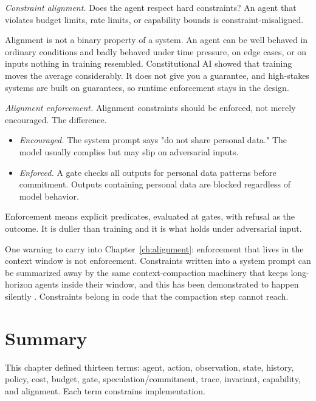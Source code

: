 \textit{Constraint alignment.} Does the agent respect hard constraints? An agent that violates budget limits, rate limits, or capability bounds is constraint-misaligned.

Alignment is not a binary property of a system. An agent can be well behaved in ordinary conditions and badly behaved under time pressure, on edge cases, or on inputs nothing in training resembled. Constitutional AI \cite{bai2022constitutional} showed that training moves the average considerably. It does not give you a guarantee, and high-stakes systems are built on guarantees, so runtime enforcement stays in the design.

\textit{Alignment enforcement.} Alignment constraints should be enforced, not merely encouraged. The difference.

\begin{itemize}
\item \textit{Encouraged.} The system prompt says "do not share personal data." The model usually complies but may slip on adversarial inputs.
\item \textit{Enforced.} A gate checks all outputs for personal data patterns before commitment. Outputs containing personal data are blocked regardless of model behavior.
\end{itemize}

Enforcement means explicit predicates, evaluated at gates, with refusal as the outcome. It is duller than training and it is what holds under adversarial input.

One warning to carry into Chapter~\ref{ch:alignment}: enforcement that lives in the context window is not enforcement. Constraints written into a system prompt can be summarized away by the same context-compaction machinery that keeps long-horizon agents inside their window, and this has been demonstrated to happen silently \cite{govdecay2026}. Constraints belong in code that the compaction step cannot reach.

\section{Summary}

This chapter defined thirteen terms: agent, action, observation, state, history, policy, cost, budget, gate, speculation/commitment, trace, invariant, capability, and alignment. Each term constrains implementation.

